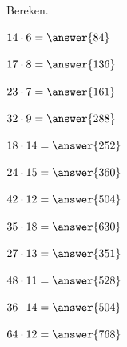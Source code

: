 \documentclass{ximera}
\begin{document}
\begin{oefening}{\oefB\ESS}

Bereken.

\begin{question} \(14\cdot6=\answer{84}\) \end{question}

\begin{question} \(17\cdot8=\answer{136}\) \end{question}

\begin{question} \(23\cdot7=\answer{161}\) \end{question}

\begin{question} \(32\cdot9=\answer{288}\) \end{question}

\begin{question} \(18\cdot14=\answer{252}\) \end{question}

\begin{question} \(24\cdot15=\answer{360}\) \end{question}

\begin{question} \(42\cdot12=\answer{504}\) \end{question}

\begin{question} \(35\cdot18=\answer{630}\) \end{question}

\begin{question} \(27\cdot13=\answer{351}\) \end{question}

\begin{question} \(48\cdot11=\answer{528}\) \end{question}

\begin{question} \(36\cdot14=\answer{504}\) \end{question}

\begin{question} \(64\cdot12=\answer{768}\) \end{question}

\end{oefening}


\end{document}
